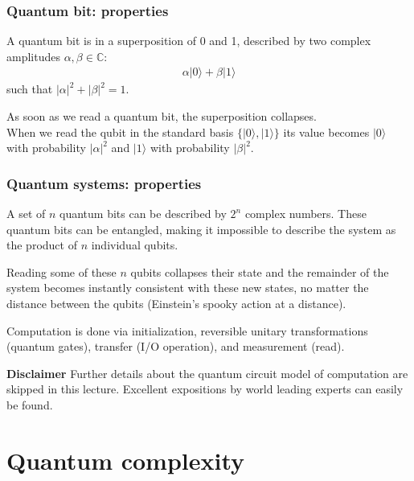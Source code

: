 	\begin{frame}
		\frametitle{Quantum bit: properties}
		
		A quantum bit is in a \alert{superposition} of 0 and 1, described by two complex amplitudes $\alpha, \beta\in \mathbb{C}$:
		\begin{align*}
			\alpha |0\rangle + \beta |1\rangle
		\end{align*}
		such that $|\alpha|^2 + |\beta|^2 = 1$.
		
		\medskip
		As soon as we read a quantum bit, the superposition collapses.\\ When we read the qubit in the standard basis $\{|0\rangle,|1\rangle\}$ its value becomes $|0\rangle$ with probability $|\alpha|^2$ and $|1\rangle$ with probability $|\beta|^2$.
	\end{frame}
	
	\begin{frame}
		\frametitle{Quantum systems: properties}
		
		A set of $n$ quantum bits can be described by $2^n$ complex numbers. These quantum bits can be \alert{entangled}, making it impossible to describe the system as the product of $n$ individual qubits.
		
		\medskip
		Reading some of these $n$ qubits collapses their state and the remainder of the system becomes instantly consistent with these new states, no matter the distance between the qubits (Einstein's \alert{spooky action at a distance}).
		
		\medskip
		Computation is done via initialization, reversible unitary transformations (quantum gates), transfer (I/O operation), and measurement (read).
		
		\pause
		\medskip
		\noindent
		\textbf{Disclaimer} Further details about the quantum circuit model of computation are skipped in this lecture. Excellent expositions by world leading experts can easily be found.
		
	\end{frame}
	
	\section{Quantum complexity}
	
